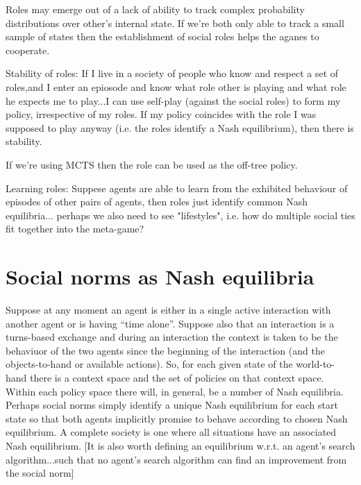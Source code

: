 \documentclass[a4paper]{article}
\begin{document}
Roles may emerge out of a lack of ability to track complex probability distributions over other's internal state. If we're both only able to track a small sample of states then the establishment of social roles helps the aganes to cooperate.


Stability of roles: If I live in a society of people who know and respect a set of roles,and I enter an epiosode and know what role other is playing and what role he expects me to play...I can use self-play (against the social roles) to form my policy, irrespective of my roles. If my policy coincides with the role I was supposed to play anyway (i.e. the roles identify a Nash equilibrium), then there is stability.

If we're using MCTS then the role can be used as the off-tree policy.

Learning roles: Suppese agents are able to learn from the exhibited behaviour of episodes of other pairs of agents, then roles just identify common Nash equilibria... perhaps we also need to see "lifestyles", i.e. how do multiple social ties fit together into the meta-game?
 
\section{Social norms as Nash equilibria}

Suppose at any moment an agent is either in a single active interaction with another agent or is having ``time alone''. Suppose also that an interaction is a turns-based exchange and during an interaction the context is taken to be the behaviuor of the two agents since the beginning of the interaction (and the objects-to-hand or available actions). So, for each given state of the world-to-hand there is a context space and the set of policies on that context space. Within each policy space there will, in general, be a number of Nash equilibria. Perhaps social norms simply identify a unique Nash equilibrium for each start state so that both agents implicitly promise to behave according to chosen Nash equilibrium. A complete society is one where all situations have an associated Nash equilibrium. [It is also worth defining an equilibrium w.r.t. an agent's search algorithm...such that no agent's search algorithm can find an improvement from the social norm]

\end{document}
